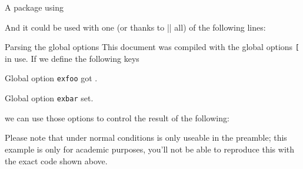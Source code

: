 \begin{example}{A package using \expkvo}
\begin{enverb}[no-tcb]
    \renewcommand*\thefootnote
      {%
        \ifx\exfn@color\@empty
          \csname\exfn@format\endcsname{footnote}%
        \else
          \textcolor{\exfn@color}{\csname\exfn@format\endcsname{footnote}}%
        \fi
      }
  \end{enverb}
  And it could be used with one (or thanks to |\ekvoProcessFutureOptions| all)
  of the following lines:
  \begin{enverb}[no-tcb]
    \usepackage{ex-footnote}
    \usepackage[format=fnsymbol]{ex-footnote}
    \usepackage[color=green]{ex-footnote}
    \usepackage[color=red,format=roman]{ex-footnote}
  \end{enverb}
\end{example}

\begin{example}{Parsing the global options}
  This document was compiled with the global options
  \texttt{[\detokenize\expandafter\expandafter\expandafter{\csname @raw@classoptionslist\endcsname]}}
  in use. If we define the following keys
  \begin{enverb}
      {Global option \texttt{exfoo} got \texttt{}.\par}
      {Global option \texttt{exbar} set.\par}
  \end{enverb}
  we can use those options to control the result of the following:
  \begin{enverb}[restore,same-line=.55]
  \end{enverb}
  Please note that under normal conditions
   is only useable in the preamble; this
  example is only for academic purposes, you'll not be able to reproduce this
  with the exact code shown above.
\end{example}
